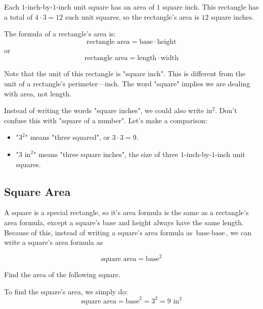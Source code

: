 Each $1$-inch-by-$1$-inch unit square has an area of $1$ square inch. This rectangle has a total of $4 \cdot 3 = 12$ such unit squares, so the rectangle's area is $12$ square inches.

The formula of a rectangle's area is:
\[ \text{rectangle area}=\text{base} \cdot \text{height} \]
or
\[ \text{rectangle area}=\text{length} \cdot \text{width} \]

Note that the unit of this rectangle is "square inch". This is different from the unit of a rectangle's perimeter---inch. The word "square" implies we are dealing with area, not length.

Instead of writing the words "square inches", we could also write $\text{in}^{2}$. Don't confuse this with "square of a number". Let's make a comparison:
\begin{itemize}
\item "$3^{2}$" means "three squared", or $3\cdot3=9$.
\item "$3 \text{ in}^{2}$" means "three square inches", the size of three $1$-inch-by-$1$-inch unit squares.
\end{itemize}

\subsection{Square Area}
A square is a special rectangle, so it's area formula is the same as a rectangle's area formula, except a square's base and height always have the same length. Because of this, instead of writing a square's area formula as $\text{base} \cdot \text{base}$, we can write a square's area formula as

\[ \text{square area} = \text{base}^{2} \]

\begin{myexample}
Find the area of the following square.

\begin{center}
\label{fig: squArea}
\end{center}
\end{myexample}

\begin{solution}
To find the square's area, we simply do:
\[ \text{square area}=\text{base}^{2}=3^{2}=9 \text{ in}^{2} \]
\end{solution}

